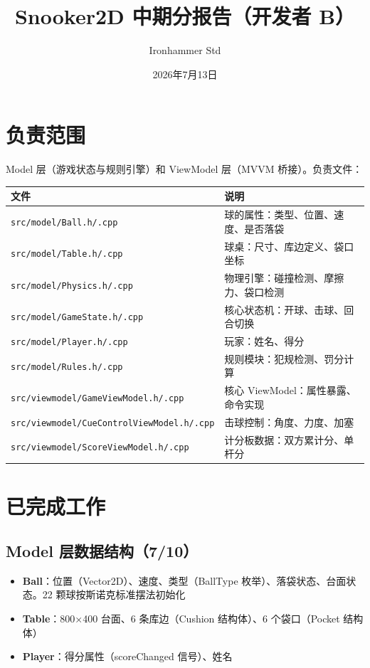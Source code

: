 \documentclass[11pt]{ctexart}
\title{Snooker2D 中期分报告（开发者 B）}
\author{Ironhammer Std}
\date{2026年7月13日}
\begin{document}
\maketitle

\section{负责范围}

Model 层（游戏状态与规则引擎）和 ViewModel 层（MVVM 桥接）。负责文件：

\begin{center}
\begin{tabular}{|l|l|}
\hline
\textbf{文件} & \textbf{说明} \\
\hline
\texttt{src/model/Ball.h/.cpp} & 球的属性：类型、位置、速度、是否落袋 \\
\texttt{src/model/Table.h/.cpp} & 球桌：尺寸、库边定义、袋口坐标 \\
\texttt{src/model/Physics.h/.cpp} & 物理引擎：碰撞检测、摩擦力、袋口检测 \\
\texttt{src/model/GameState.h/.cpp} & 核心状态机：开球、击球、回合切换 \\
\texttt{src/model/Player.h/.cpp} & 玩家：姓名、得分 \\
\texttt{src/model/Rules.h/.cpp} & 规则模块：犯规检测、罚分计算 \\
\texttt{src/viewmodel/GameViewModel.h/.cpp} & 核心 ViewModel：属性暴露、命令实现 \\
\texttt{src/viewmodel/CueControlViewModel.h/.cpp} & 击球控制：角度、力度、加塞 \\
\texttt{src/viewmodel/ScoreViewModel.h/.cpp} & 计分板数据：双方累计分、单杆分 \\
\hline
\end{tabular}
\end{center}

\section{已完成工作}

\subsection{Model 层数据结构（7/10）}

\begin{itemize}
\item \textbf{Ball}：位置（Vector2D）、速度、类型（BallType 枚举）、落袋状态、台面状态。22 颗球按斯诺克标准摆法初始化
\item \textbf{Table}：800×400 台面、6 条库边（Cushion 结构体）、6 个袋口（Pocket 结构体）
\item \textbf{Player}：得分属性（scoreChanged 信号）、姓名
\end{itemize}
\end{document}
